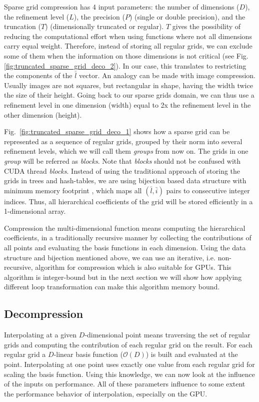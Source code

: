 Sparse grid compression has 4 input parameters: the number of dimensions
($D$), the refinement level ($L$), the
precision ($P$) (single or double precision), and the truncation ($T$)
(dimensionally truncated or regular). $T$ gives the possibility of reducing the
computational effort when using functions where not all dimensions carry
equal weight. Therefore, instead of storing all regular grids, we can exclude
some of them when the information on those dimensions is not critical (see Fig.
\ref{fig:truncated_sparse_grid_deco_2}). In our case, this translates to
restricting the components of the $\bar{l}$ vector. An analogy can be made with
image compression. Usually images are not squares, but rectangular in shape,
having the width twice the size of their height. Going back to our sparse grids
domain, we can thus use a refinement level in one dimension (width) equal to 2x
the refinement level in the other dimension (height).

Fig.~\ref{fig:truncated_sparse_grid_deco_1} shows how a sparse grid can be
represented as a sequence of regular grids, grouped by their norm into several
refinement levels, which we will call them \textit{groups} from now on. The grids
in one \textit{group} will be referred as \textit{blocks}. Note that \textit{blocks} should not be confused 
with CUDA thread \textit{blocks}. Instead of using the
traditional approach of storing the grids in trees and hash-tables, we are using
bijection based data structure with minimum memory footprint
\cite{Murarasu:2011:CDS:1941553.1941559}, which maps all $(\bar{l},\bar{i})$
pairs to consecutive integer indices. Thus, all hierarchical coefficients of the
grid will be stored efficiently in a 1-dimensional array.

Compression the multi-dimensional function means computing the hierarchical
coefficients, in a traditionally recursive manner by collecting the
contributions of all points and evaluating the basis functions in each
dimension. Using the data structure and bijection mentioned above, we can use an
iterative, i.e. non-recursive, algorithm for compression which is also suitable for
GPUs. This algorithm is integer-bound but in the next section we will show how applying
different loop transformation can make this algorithm memory bound.

\subsection{Decompression}

Interpolating at a given $D$-dimensional point means traversing the set of
regular grids and computing the contribution of each regular grid on the result. For
each regular grid a $D$-linear basis function ($\mathcal{O}(D)$) is built and
evaluated at the point. Interpolating at one point uses exactly one value from each
regular grid for scaling the basis function. Using this knowledge, we can now
look at the influence of the inputs on performance. All of these parameters
influence to some extent the performance behavior of interpolation, especially
on the GPU.

